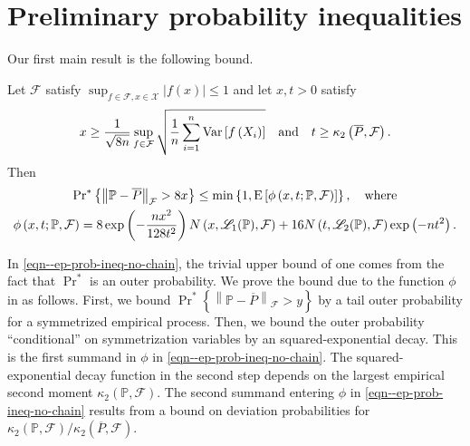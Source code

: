 
\section{Preliminary probability inequalities}
\label{sec--prob-ineq-prelim}

Our first main result is the following bound.

\begin{theorem}
\label{thm--ep-prob-ineq-no-chain}
Let \(\mathcal{F}\) satisfy \(\sup_{f \in \mathcal{F}, x \in \mathcal{X}} |f
(x)| \leq 1\) and let \(x, t > 0\) satisfy
\begin{equation*}
  x \geq \frac{1}{\sqrt{8 n}} \sup_{f \in \mathcal{F}} \sqrt{\frac{1}{n} \sum_{i
  = 1}^{n} \mathrm{Var} \left[ f \left( X_{i} \right) \right]} \quad \text{and} \quad
  t \geq \kappa_{2} \left( \overline{P}, \mathcal{F} \right).
\end{equation*}
Then
\begin{equation}
  \begin{gathered}
    \mathrm{Pr}^{\ast} \left\{ \left\| \mathbb{P} - \overline{P}
    \right\|_{\mathcal{F}} > 8 x \right\} \leq
    \min \left\{ 1, \mathrm{E} \left[ \phi \left( x, t; \mathbb{P}, \mathcal{F} \right)
    \right] \right\}, \quad \text{where}
    \\
    \phi \left( x, t; \mathbb{P}, \mathcal{F} \right) =
    8 \exp \left( - \frac{n x^{2}}{128 t^{2}} \right) N \left( x,
    \mathscr{L}_{1} (\mathbb{P}), \mathcal{F} \right) +
    16 N \left( t, \mathscr{L}_{2} (\mathbb{P}), \mathcal{F} \right) \exp \left(
    - n t^{2} \right).
  \end{gathered}
  \label{eqn--ep-prob-ineq-no-chain}
\end{equation}
\end{theorem}

In \eqref{eqn--ep-prob-ineq-no-chain}, the trivial upper bound of one comes from
the fact that \(\Pr^{\ast}\) is an outer probability.
We prove the bound due to the function \(\phi\) in
 as follows.
First, we bound \(\Pr^{\ast} \left\{ \left\| \mathbb{P} - \overline{P}
\right\|_{\mathcal{F}} > y \right\}\) by a tail outer probability for a
symmetrized empirical process.
Then, we bound the outer probability ``conditional'' on symmetrization variables
by an squared-exponential decay.
This is the first summand in \(\phi\) in \eqref{eqn--ep-prob-ineq-no-chain}.
The squared-exponential decay function in the second step depends on the largest
empirical second moment \(\kappa_{2} (\mathbb{P}, \mathcal{F})\).
The second summand entering \(\phi\) in \eqref{eqn--ep-prob-ineq-no-chain}
results from a bound on deviation probabilities for
\(\kappa_{2} (\mathbb{P}, \mathcal{F}) / \kappa_{2} (\overline{P},
\mathcal{F})\).

